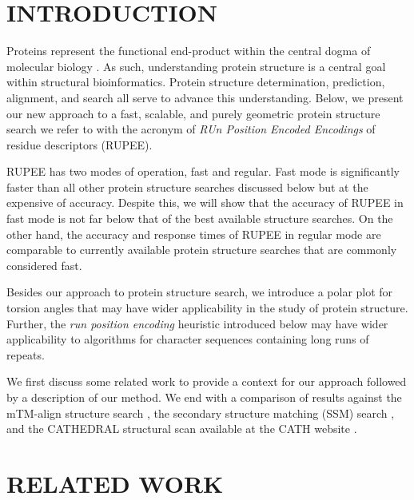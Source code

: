 \documentclass[a4,center,fleqn]{NAR}
\begin{document}
\section{INTRODUCTION}

Proteins represent the functional end-product within the central dogma of molecular biology \cite{Crick1970}.
As such, understanding protein structure is a central goal within structural bioinformatics. 
Protein structure determination, prediction, alignment, and search all serve to advance this understanding. 
Below, we present our new approach to a fast, scalable, and purely geometric protein structure search we refer to with the acronym of \emph{RUn Position Encoded Encodings} of residue descriptors (RUPEE).

RUPEE has two modes of operation, fast and regular. 
Fast mode is significantly faster than all other protein structure searches discussed below but at the expensive of accuracy.
Despite this, we will show that the accuracy of RUPEE in fast mode is not far below that of the best available structure searches. 
On the other hand, the accuracy and response times of RUPEE in regular mode are comparable to currently available protein structure searches that are commonly considered fast. 

Besides our approach to protein structure search, we introduce a polar plot for torsion angles that may have wider applicability in the study of protein structure. 
Further, the \emph{run position encoding} heuristic introduced below may have wider applicability to algorithms for character sequences containing long runs of repeats. 

We first discuss some related work to provide a context for our approach followed by a description of our method. 
We end with a comparison of results against the mTM-align structure search \cite{Dong2018}, the secondary structure matching (SSM) search \cite{Krissinel2004}, and the CATHEDRAL structural scan \cite{Redfern2007} available at the CATH website \cite{Sillitoe2015}.

\enlargethispage{-65.1pt}

\section{RELATED WORK}
\end{document}
